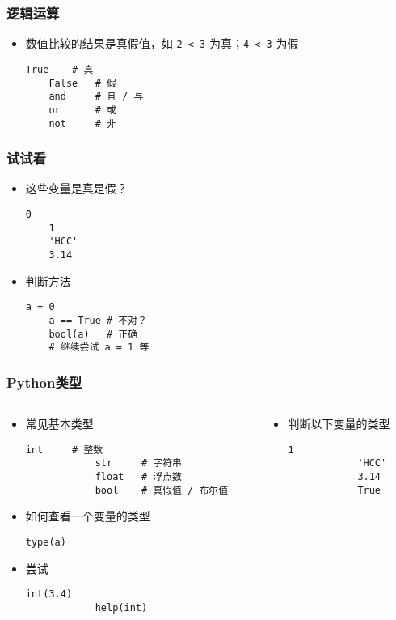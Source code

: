 \begin{CJK}{UTF8}{gbsn}
\begin{frame} [fragile]
	\frametitle{逻辑运算}
	\begin{itemize}
	\item 数值比较的结果是真假值，如 \texttt{2 < 3} 为真；\texttt{4 < 3} 为假
	\begin{lstlisting}[style=pythonstyle, gobble=4, texcl,
						basicstyle=\linespread{1.5}\ttfamily]
	True	# 真
	False	# 假
	and		# 且 / 与
	or		# 或
	not		# 非
	\end{lstlisting}
	\end{itemize}
\end{frame}

\begin{frame} [fragile]
	\frametitle{试试看}
	\begin{itemize}
	\item 这些变量是真是假？
	\begin{lstlisting}[style=pythonstyle, gobble=4]
	0
	1
	'HCC'
	3.14
	\end{lstlisting}
	\item 判断方法
	\begin{lstlisting}[style=pythonstyle, gobble=4, texcl]
	a = 0
	a == True # 不对？
	bool(a)   # 正确
	# 继续尝试 a = 1 等
	\end{lstlisting}
	\end{itemize}
\end{frame}

\begin{frame} [fragile]
	\frametitle{Python类型}
	\begin{columns}[T]
		\begin{column}[T]{.6\textwidth}
			\begin{itemize}
			\item 常见基本类型
			\begin{lstlisting}[style=pythonstyle, gobble=12, texcl]
			int		# 整数
			str		# 字符串
			float	# 浮点数
			bool	# 真假值 / 布尔值
			\end{lstlisting}
			\item 如何查看一个变量的类型
			\begin{lstlisting}[style=pythonstyle, gobble=12, texcl]
			type(a)
			\end{lstlisting}
			\item 尝试
			\begin{lstlisting}[style=pythonstyle, gobble=12, texcl]
			int(3.4)
			help(int)
			\end{lstlisting}
			\end{itemize}
		\end{column}
		\begin{column}[T]{.4\textwidth}
			\begin{itemize}
			\item 判断以下变量的类型
			\begin{lstlisting}[style=pythonstyle, gobble=12, texcl]
			1
			'HCC'
			3.14
			True
			\end{lstlisting}
			\end{itemize}
		\end{column}
	\end{columns}
\end{frame}


\end{CJK}
